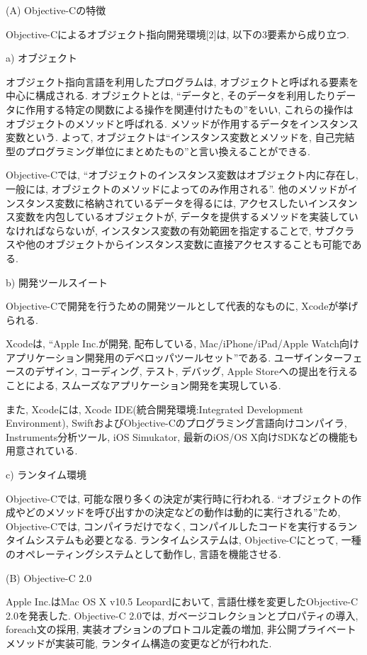 \begin{description}
\item (A) Objective-Cの特徴

Objective-Cによるオブジェクト指向開発環境[2]は, 以下の3要素から成り立つ.

\begin{description}
\item a) オブジェクト

オブジェクト指向言語を利用したプログラムは, オブジェクトと呼ばれる要素を中心に構成される.
オブジェクトとは, “データと, そのデータを利用したりデータに作用する特定の関数による操作を関連付けたもの”をいい, これらの操作はオブジェクトのメソッドと呼ばれる.
メソッドが作用するデータをインスタンス変数という.
よって, オブジェクトは“インスタンス変数とメソッドを, 自己完結型のプログラミング単位にまとめたもの”と言い換えることができる.

Objective-Cでは, “オブジェクトのインスタンス変数はオブジェクト内に存在し, 一般には, オブジェクトのメソッドによってのみ作用される”.
他のメソッドがインスタンス変数に格納されているデータを得るには, アクセスしたいインスタンス変数を内包しているオブジェクトが, データを提供するメソッドを実装していなければならないが, インスタンス変数の有効範囲を指定することで, サブクラスや他のオブジェクトからインスタンス変数に直接アクセスすることも可能である.

\item b) 開発ツールスイート

Objective-Cで開発を行うための開発ツールとして代表的なものに, Xcodeが挙げられる.

Xcodeは, “Apple Inc.が開発, 配布している, Mac/iPhone/iPad/Apple Watch向けアプリケーション開発用のデベロッパツールセット”である.
ユーザインターフェースのデザイン, コーディング, テスト, デバッグ, Apple Storeへの提出を行えることによる, スムーズなアプリケーション開発を実現している.

また, Xcodeには, Xcode IDE(統合開発環境:Integrated Development Environment), SwiftおよびObjective-Cのプログラミング言語向けコンパイラ, Instruments分析ツール, iOS Simukator, 最新のiOS/OS X向けSDKなどの機能も用意されている.

\item c) ランタイム環境

Objective-Cでは, 可能な限り多くの決定が実行時に行われる.
“オブジェクトの作成やどのメソッドを呼び出すかの決定などの動作は動的に実行される”ため, Objective-Cでは, コンパイラだけでなく, コンパイルしたコードを実行するランタイムシステムも必要となる.
ランタイムシステムは, Objective-Cにとって, 一種のオペレーティングシステムとして動作し, 言語を機能させる.
\end{description}

\item (B) Objective-C 2.0

Apple Inc.はMac OS X v10.5 Leopardにおいて, 言語仕様を変更したObjective-C 2.0を発表した.
Objective-C 2.0では, ガベージコレクションとプロパティの導入, foreach文の採用, 実装オプションのプロトコル定義の増加, 非公開プライベートメソッドが実装可能, ランタイム構造の変更などが行われた.
\end{description}

